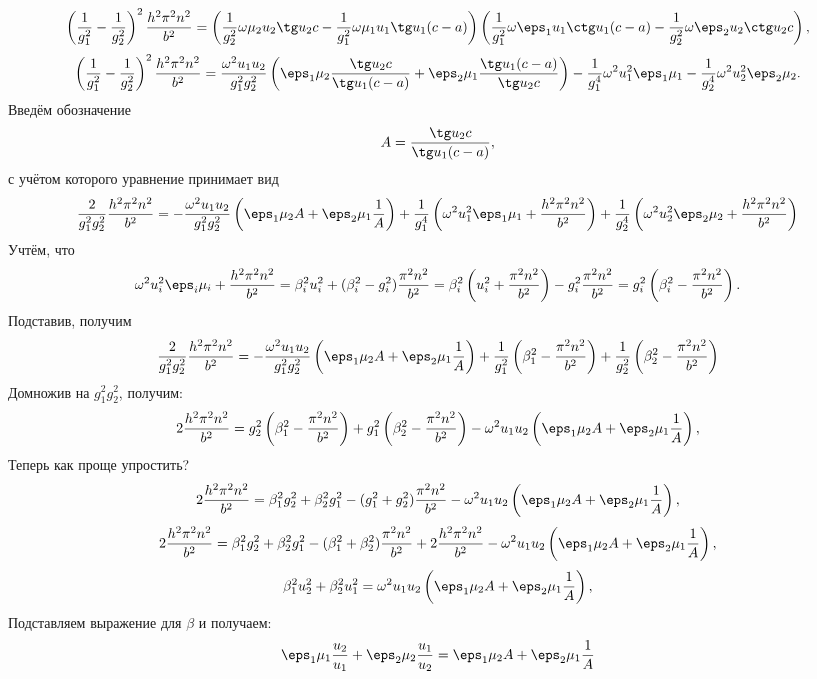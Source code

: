 \documentclass[a4paper]{hedsemwork}
\renewcommand{\frac}{\dfrac}
\begin{document}
\[
    \left( \frac{1}{g_1^2} - \frac{1}{g_2^2} \right)^2\frac{h^2\pi^2n^2}{b^2}=
    \left(\frac{1}{g_2^2}\omega\mu_2u_2\tg u_2 c-
    \frac{1}{g_1^2}\omega\mu_1u_1\tg u_1 (c-a)\right)
    \left(\frac{1}{g_1^2}\omega\eps_1u_1\ctg u_1 (c-a)-
    \frac{1}{g_2^2}\omega\eps_2u_2\ctg u_2 c\right),
\]
\[
    \left( \frac{1}{g_1^2} - \frac{1}{g_2^2} \right)^2\frac{h^2\pi^2n^2}{b^2}=
    \frac{\omega^2u_1u_2}{g_1^2g_2^2}\left(\eps_1\mu_2\frac{\tg u_2 c}{\tg u_1
    (c-a)} + \eps_2\mu_1\frac{\tg u_1 (c-a)}{\tg u_2 c}\right) -\frac{1}{g_1^4}
    \omega^2u_1^2\eps_1\mu_1 - \frac{1}{g_2^4}\omega^2u_2^2\eps_2\mu_2.
\]
Введём обозначение
\[
    A = \frac{\tg u_2 c}{\tg u_1 (c-a)},
\]
с учётом которого уравнение принимает вид
\[
    \frac{2}{g_1^2 g_2^2}\frac{h^2\pi^2n^2}{b^2} =
    -\frac{\omega^2u_1u_2}{g_1^2g_2^2}\left(\eps_1\mu_2 A +
    \eps_2\mu_1\frac{1}{A}\right) +
    \frac{1}{g_1^4}
    \left(\omega^2u_1^2\eps_1\mu_1 + \frac{h^2\pi^2n^2}{b^2}\right) +
    \frac{1}{g_2^4}
    \left(\omega^2u_2^2\eps_2\mu_2 + \frac{h^2\pi^2n^2}{b^2}\right)
\]
Учтём, что
\[
    \omega^2u_i^2\eps_i\mu_i + \frac{h^2\pi^2n^2}{b^2} = \beta_i^2u_i^2 +
    (\beta_i^2 - g_i^2)\frac{\pi^2n^2}{b^2} =
    \beta_i^2\left( u_i^2 + \frac{\pi^2n^2}{b^2} \right) -
    g_i^2\frac{\pi^2n^2}{b^2} =
    g_i^2\left( \beta_i^2 - \frac{\pi^2n^2}{b^2}\right).
\]
Подставив, получим
\[
    \frac{2}{g_1^2 g_2^2}\frac{h^2\pi^2n^2}{b^2} =
    -\frac{\omega^2u_1u_2}{g_1^2g_2^2}\left(\eps_1\mu_2 A +
    \eps_2\mu_1\frac{1}{A}\right) +
    \frac{1}{g_1^2}
    \left(\beta_1^2 - \frac{\pi^2n^2}{b^2}\right) +
    \frac{1}{g_2^2}
    \left(\beta_2^2 - \frac{\pi^2n^2}{b^2}\right)
\]
Домножив на \( g_1^2g_2^2 \), получим:
\[
    2\frac{h^2\pi^2n^2}{b^2} = g_2^2
    \left(\beta_1^2 - \frac{\pi^2n^2}{b^2}\right) +
    g_1^2\left(\beta_2^2 - \frac{\pi^2n^2}{b^2}\right)-
    \omega^2u_1u_2\left(\eps_1\mu_2 A +
    \eps_2\mu_1\frac{1}{A}\right),
\]
Теперь как проще упростить?
\[
    2\frac{h^2\pi^2n^2}{b^2} =
    \beta_1^2 g_2^2 + \beta_2^2 g_1^2 -
    (g_1^2+g_2^2)\frac{\pi^2n^2}{b^2} -
    \omega^2u_1u_2\left(\eps_1\mu_2 A +
    \eps_2\mu_1\frac{1}{A}\right),
\]
\[
    2\frac{h^2\pi^2n^2}{b^2} =
    \beta_1^2 g_2^2 + \beta_2^2 g_1^2 -
    (\beta_1^2+\beta_2^2)\frac{\pi^2n^2}{b^2} +
    2\frac{h^2\pi^2n^2}{b^2} -
    \omega^2u_1u_2\left(\eps_1\mu_2 A +
    \eps_2\mu_1\frac{1}{A}\right),
\]
\[
    \beta_1^2u_2^2 + \beta_2^2u_1^2=
    \omega^2u_1u_2\left(\eps_1\mu_2 A +
    \eps_2\mu_1\frac{1}{A}\right),
\]
Подставляем выражение для \( \beta \) и получаем:
\[
    \eps_1\mu_1\frac{u_2}{u_1} + \eps_2\mu_2\frac{u_1}{u_2} =
    \eps_1\mu_2 A + \eps_2\mu_1\frac{1}{A}
\]
\end{document}
